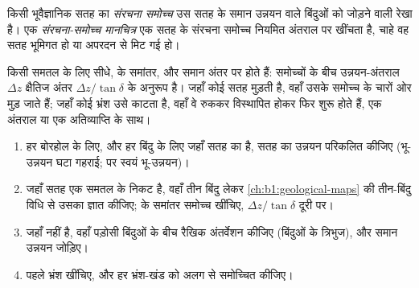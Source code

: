 \begin{definition}\label{def:b1:cross-sections:structure-contour}
किसी भूवैज्ञानिक सतह का \emph{संरचना समोच्च} उस सतह के समान उन्नयन वाले बिंदुओं को जोड़ने वाली
रेखा है। एक \emph{संरचना-समोच्च मानचित्र} एक सतह के संरचना समोच्च नियमित अंतराल पर
खींचता है, चाहे वह सतह भूमिगत हो या अपरदन से मिट गई हो।
\end{definition}

किसी समतल के लिए  सीधे,  के समांतर, और समान अंतर पर होते हैं: समोच्चों के बीच उन्नयन-अंतराल
$\Delta z$ क्षैतिज अंतर $\Delta z/\tan\delta$ के अनुरूप है। जहाँ कोई सतह मुड़ती है, वहाँ उसके समोच्च  के चारों ओर
मुड़ जाते हैं; जहाँ कोई भ्रंश उसे काटता है, वहाँ वे रुककर विस्थापित होकर फिर शुरू होते हैं, एक अंतराल या एक अतिव्याप्ति के साथ।

\begin{method}[संरचना-समोच्च मानचित्र बनाना]\label{met:b1:cross-sections:structure-contours}
\begin{enumerate}
  \item हर बोरहोल के लिए, और हर बिंदु के लिए जहाँ सतह का  है, सतह का उन्नयन परिकलित कीजिए (भू-उन्नयन घटा
        गहराई;  पर स्वयं भू-उन्नयन)।
  \item जहाँ सतह एक समतल के निकट है, वहाँ तीन बिंदु लेकर \cref{ch:b1:geological-maps} की तीन-बिंदु विधि से उसका
         ज्ञात कीजिए;  के समांतर समोच्च खींचिए, $\Delta z/\tan\delta$ दूरी पर।
  \item जहाँ नहीं है, वहाँ पड़ोसी बिंदुओं के बीच रैखिक अंतर्वेशन कीजिए (बिंदुओं के त्रिभुज), और समान उन्नयन जोड़िए।
  \item पहले भ्रंश खींचिए, और हर भ्रंश-खंड को अलग से समोच्चित कीजिए।
\end{enumerate}
\end{method}

